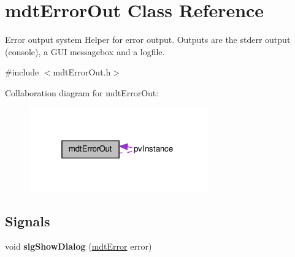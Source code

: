\hypertarget{classmdt_error_out}{
\section{mdtErrorOut Class Reference}
\label{classmdt_error_out}
}


Error output system Helper for error output. Outputs are the stderr output (console), a GUI messagebox and a logfile.  




{\ttfamily \#include $<$mdtErrorOut.h$>$}



Collaboration diagram for mdtErrorOut:\nopagebreak
\begin{figure}[H]
\begin{center}
\leavevmode
\includegraphics[width=217pt]{classmdt_error_out__coll__graph}
\end{center}
\end{figure}
\subsection*{Signals}
\begin{DoxyCompactItemize}
\item 
\hypertarget{classmdt_error_out_a033747841ec3340f0396e574723095d7}{
void {\bfseries sigShowDialog} (\hyperlink{classmdt_error}{mdtError} error)}
\label{classmdt_error_out_a033747841ec3340f0396e574723095d7}

\end{DoxyCompactItemize}
